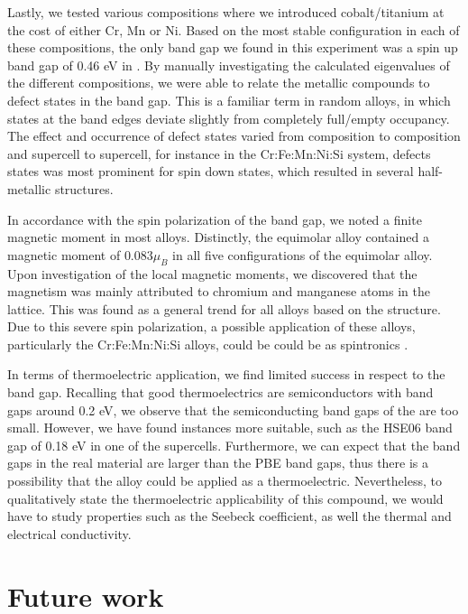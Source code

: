 \documentclass[UKenglish]{ifimaster}  %
\begin{document}
Lastly, we tested various compositions where we introduced cobalt/titanium at the cost of either Cr, Mn or Ni. Based on the most stable configuration in each of these compositions, the only band gap we found in this experiment was a spin up band gap of 0.46 eV in . By manually investigating the calculated eigenvalues of the different compositions, we were able to relate the metallic compounds to defect states in the band gap. This is a familiar term in random alloys, in which states at the band edges deviate slightly from completely full/empty occupancy. The effect and occurrence of defect states varied from composition to composition and supercell to supercell, for instance in the Cr:Fe:Mn:Ni:Si system, defects states was most prominent for spin down states, which resulted in several half-metallic structures. 

In accordance with the spin polarization of the band gap, we noted a finite magnetic moment in most alloys.  Distinctly, the equimolar alloy contained a magnetic moment of $0.083 \mu_B$ in all five configurations of the equimolar alloy. Upon investigation of the local magnetic moments, we discovered that the magnetism was mainly attributed to chromium and manganese atoms in the lattice. This was found as a general trend for all alloys based on the  structure. Due to this severe spin polarization, a possible application of these alloys, particularly the Cr:Fe:Mn:Ni:Si alloys, could be  could be as spintronics \cite{spintronic}. 

In terms of thermoelectric application, we find limited success in respect to the band gap. Recalling that good thermoelectrics are semiconductors with band gaps around 0.2 eV, we observe that the semiconducting band gaps of the  are too small. However, we have found instances more suitable, such as the HSE06 band gap of 0.18 eV in one of the supercells. Furthermore, we can expect that the band gaps in the real material are larger than the PBE band gaps, thus there is a possibility that the  alloy could be applied as a thermoelectric. Nevertheless, to qualitatively state the thermoelectric applicability of this compound, we would have to study properties such as the Seebeck coefficient, as well the thermal and electrical conductivity.

\chapter{Future work}
\end{document}
